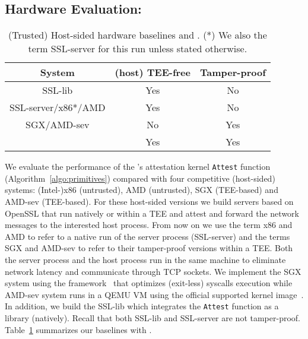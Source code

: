 \subsection{Hardware Evaluation: \trustedfpga{}}
\label{subsec:hw_eval}


\begin{table}
\begin{center}
\small
\begin{tabular}{ |c|c|c| } 
 \hline
 System &  (host) TEE-free & Tamper-proof \\ [0.5ex] \hline \hline
 SSL-lib & Yes & No\\
 SSL-server/x86*/AMD  &  Yes & No\\
 SGX/AMD-sev &  No & Yes\\
 \projecttitle{} & Yes & Yes\\
 \hline
\end{tabular}
\end{center}
\caption{(Trusted) Host-sided hardware baselines and \projecttitle{}. (*) We also the term SSL-server for this run unless stated otherwise.}
\label{tab:hw_options}
\end{table}

 We evaluate the performance of the \projecttitle{}'s attestation kernel {\tt Attest} function (Algorithm~\ref{algo:primitives}) compared with four competitive (host-sided) systems: (Intel-)x86 (untrusted), AMD (untrusted), SGX (TEE-based) and AMD-sev (TEE-based). For these host-sided versions we build servers based on OpenSSL that run natively or within a TEE and attest and forward the network messages to the interested host process. From now on we use the term x86 and AMD to refer to a native run of the server process (SSL-server) and the terms SGX and AMD-sev to refer to their tamper-proof versions within a TEE. Both the server process and the host process run in the same machine to eliminate network latency and communicate through TCP sockets. We implement the SGX system using the {\scone{}} framework~\cite{scone} that optimizes (exit-less) syscalls execution while AMD-sev system runs in a QEMU VM using the official supported kernel image~\cite{AMDSEV}. In addition, we build the SSL-lib which integrates the {\tt Attest} function as a library (natively). Recall that both SSL-lib and SSL-server are not tamper-proof. Table~\ref{tab:hw_options} summarizes our baselines with \projecttitle{}. %


